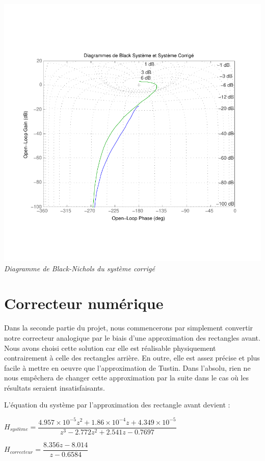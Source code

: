 \documentclass[11pt, french]{article} %
\begin{document}
\begin{center}
\includegraphics[scale=0.50]{MatBlackFredValues.pdf}
\\
\emph{Diagramme de Black-Nichols du système corrigé}
\end{center}

\section{Correcteur numérique}

Dans la seconde partie du projet, nous commencerons par simplement convertir notre correcteur analogique par le biais d'une approximation des rectangles avant. Nous avons choisi cette solution car elle est réalisable physiquement contrairement à celle des rectangles arrière. En outre, elle est assez précise et plus facile à mettre en oeuvre que l'approximation de Tustin. Dans l'absolu, rien ne nous empêchera de changer cette approximation par la suite dans le cas où les résultats seraient insatisfaisants. 

L'équation du système par l'approximation des rectangle avant devient :

$  H_{système} = \dfrac {4.957\times 10^{-5}z^{2} + 1.86\times 10^{-4}z + 4.349\times 10^{-5}} {z^{3} - 2.772z^{2} + 2.541z - 0.7697} $
\medskip

$  H_{correcteur} = \dfrac {8.356z - 8.014} {z - 0.6584} $
\medskip
 
\end{document}

